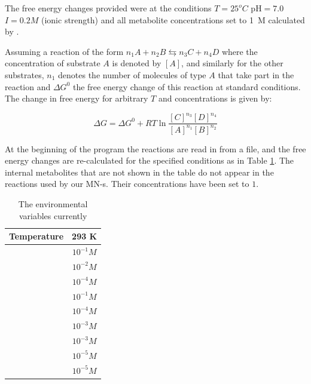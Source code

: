 \documentclass[a4paper,12pt]{article}
\begin{document}
	The free energy changes provided were at the conditions $T=25  ^o C$ pH$=7.0$ $I=0.2 M$ (ionic strength) and all metabolite concentrations set to 1~M calculated by \cite{BartekLower}. 
	
	Assuming a reaction of the form $n_1A + n_2B \leftrightarrows n_3C + n_4D$ where the concentration of substrate $A$ is denoted by $[A]$, and similarly for the other substrates, $n_1$ denotes the number of molecules of type $A$ that take part in the reaction and  $\Delta G^0$  the free energy change of this reaction at standard conditions. The change in free energy for arbitrary $T$ and concentrations is given by: 
	
	\begin{equation}\label{eq:freeechange}
		\Delta G = \Delta G^0 + R T \ln \frac{[C]^{n_3}[D]^{n_4}}{[A]^{n_1}[B]^{n_2}}
	\end{equation}
	
	At the beginning of the program the reactions are read in from a file, and the free energy changes are re-calculated for the specified conditions as in Table \ref{environmentTable}. The internal metabolites that are not shown in the table do not appear in the reactions used by our MN-s. Their concentrations have been set to $1$.  
	
	\begin{table}
		\centering
	\begin{tabular}{|c|c|}
		
		\hline Temperature & 293 K \\ 
		\hline [ATP] & $10^{-1} M$ \\ 
		\hline [ADP] & $10^{-2} M$ \\ 
		\hline [AMP] & $10^{-4} M$ \\ 
		\hline [NAD$^+$] & $10^{-1} M$ \\ 
		\hline [NADH] & $10^{-4} M$ \\ 
		\hline [Pi] &  $10^{-3} M$\\ 
		\hline [PPi] & $10^{-3} M$ \\ 
		\hline [CO$_2$] & $10^{-5} M$ \\ 
		\hline [NH$_3$] & $10^{-5} M$ \\ 

		\hline 
	\end{tabular} 
	\caption{The environmental variables currently}
	\label{environmentTable}
	\end{table}
\end{document}
